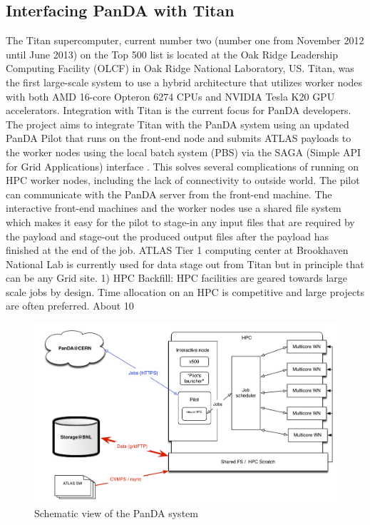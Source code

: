 \documentclass[10pt, conference, compsocconf]{IEEEtran}
\begin{document}
\subsection{Interfacing PanDA with Titan}
The Titan supercomputer, current number two (number one from November 2012 until June 2013) on the Top 500 list is located at the Oak Ridge Leadership Computing  Facility (OLCF) in Oak Ridge National Laboratory, US. Titan, was the first large-scale system to use  a hybrid architecture that utilizes worker nodes with both AMD 16-core Opteron 6274 CPUs and NVIDIA Tesla K20 GPU accelerators.
Integration with Titan is the current focus for PanDA developers. The project aims to integrate Titan with the PanDA system using an updated PanDA Pilot that runs on the front-end node and submits ATLAS payloads to the worker nodes using the local batch system (PBS) via the SAGA (Simple API for Grid Applications) interface \cite{SAGA}. This solves several complications of  running on HPC worker nodes,  including the lack of connectivity to outside world. The pilot can communicate with the PanDA server from the front-end machine. The interactive front-end  machines and the worker nodes  use  a shared  file system  which makes  it  easy  for the pilot to stage-in  any input files that are required by the payload and stage-out the produced output files after the payload has finished at the end of the job. ATLAS Tier 1 computing  center at Brookhaven National Lab is currently  used for data stage out from Titan but in principle  that can be any Grid site.
1) HPC Backfill: HPC facilities are geared towards  large scale jobs by design. Time allocation on an HPC is competitive and large projects are often preferred. About 10%
\begin{figure}
\begin{center}
\includegraphics[width=\columnwidth]{figures/PandaInterfaceWithHPC.png}
\caption{Schematic view of the PanDA system\label{fig:architecture}}
\end{center}
\end{figure}
\end{document}
